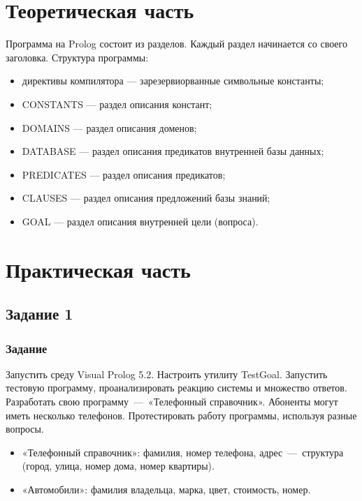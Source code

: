 \setcounter{page}{3}

\chapter{Теоретическая часть}
Программа на Prolog состоит из разделов. Каждый раздел начинается со своего заголовка. Структура программы:

\begin{itemize}
	\item директивы компилятора — зарезервиорванные символьные константы;
	\item CONSTANTS — раздел описания констант;
	\item DOMAINS — раздел описания доменов;
	\item DATABASE — раздел описания предикатов внутренней базы данных;
	\item PREDICATES — раздел описания предикатов;
	\item CLAUSES — раздел описания предложений базы знаний;
	\item GOAL — раздел описания внутренней цели (вопроса).
\end{itemize}

\newpage

\chapter{Практическая часть}

\section{Задание 1}
\subsection*{Задание}
Запустить среду Visual Prolog 5.2. Настроить утилиту TestGoal.
Запустить тестовую программу, проанализировать реакцию системы и множество ответов.
Разработать свою программу~---~«Телефонный справочник». Абоненты могут иметь несколько телефонов. Протестировать работу программы, используя разные вопросы.

\begin{itemize}
  \item «Телефонный справочник»: фамилия, номер телефона, адрес~---~структура (город, улица, номер дома, номер квартиры).
  \item «Автомобили»: фамилия владельца, марка, цвет, стоимость, номер.
\end{itemize}

